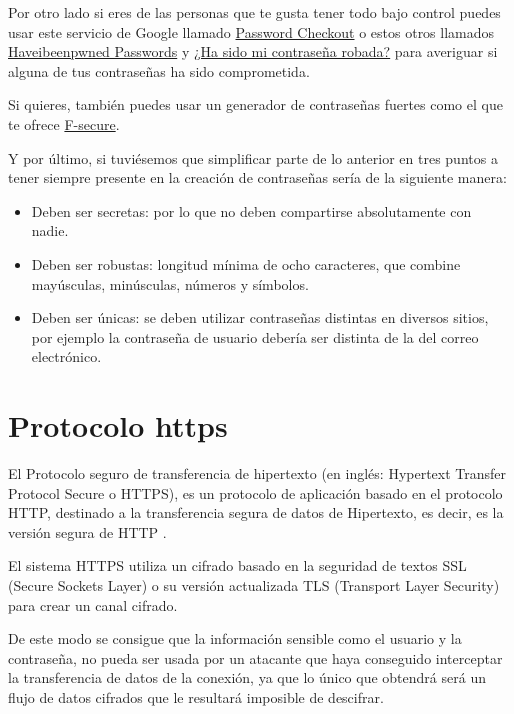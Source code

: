\documentclass[
  spanish,
  a4paper,
  openany]{book}
\begin{document}
Por otro lado si eres de las personas que te gusta tener todo bajo control puedes usar este servicio de Google llamado \href{https://www.blog.google/technology/safety-security/google-password-checkup-cross-account-protection/}{Password Checkout} o estos otros llamados \href{https://haveibeenpwned.com/Passwords}{Haveibeenpwned Passwords} y \href{https://www.avast.com/hackcheck}{¿Ha sido mi contraseña robada?} para averiguar si alguna de tus contraseñas ha sido comprometida.

Si quieres, también puedes usar un generador de contraseñas fuertes como el que te ofrece \href{https://www.f-secure.com/en/home/free-tools/password-generator}{F-secure}.

Y por último, si tuviésemos que simplificar parte de lo anterior en tres puntos a tener siempre presente en la creación de contraseñas sería de la siguiente manera:

\begin{itemize}
\item
  Deben ser secretas: por lo que no deben compartirse absolutamente con nadie.
\item
  Deben ser robustas: longitud mínima de ocho caracteres, que combine mayúsculas, minúsculas, números y símbolos.
\item
  Deben ser únicas: se deben utilizar contraseñas distintas en diversos sitios, por ejemplo la contraseña de usuario debería ser distinta de la del correo electrónico.
\end{itemize}

\hypertarget{protocolo-https}{%
\section{Protocolo https}\label{protocolo-https}}

El Protocolo seguro de transferencia de hipertexto (en inglés: Hypertext Transfer Protocol Secure o HTTPS), es un protocolo de aplicación basado en el protocolo HTTP, destinado a la transferencia segura de datos de Hipertexto, es decir, es la versión segura de HTTP \citep{WIKI-https}.

El sistema HTTPS utiliza un cifrado basado en la seguridad de textos SSL (Secure Sockets Layer) o su versión actualizada TLS (Transport Layer Security) para crear un canal cifrado.

De este modo se consigue que la información sensible como el usuario y la contraseña, no pueda ser usada por un atacante que haya conseguido interceptar la transferencia de datos de la conexión, ya que lo único que obtendrá será un flujo de datos cifrados que le resultará imposible de descifrar.
\end{document}
